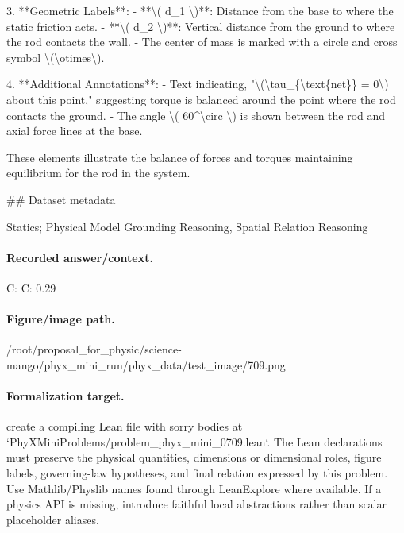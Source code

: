 3. **Geometric Labels**:
   - **\textbackslash{}( d\_1 \textbackslash{})**: Distance from the base to where the static friction acts.
   - **\textbackslash{}( d\_2 \textbackslash{})**: Vertical distance from the ground to where the rod contacts the wall.
   - The center of mass is marked with a circle and cross symbol \textbackslash{}(\textbackslash{}otimes\textbackslash{}).

4. **Additional Annotations**:
   - Text indicating, "\textbackslash{}(\textbackslash{}tau\_\{\textbackslash{}text\{net\}\} = 0\textbackslash{}) about this point," suggesting torque is balanced around the point where the rod contacts the ground.
   - The angle \textbackslash{}( 60\textasciicircum{}\textbackslash{}circ \textbackslash{}) is shown between the rod and axial force lines at the base.

These elements illustrate the balance of forces and torques maintaining equilibrium for the rod in the system.

\#\# Dataset metadata

Statics; Physical Model Grounding Reasoning, Spatial Relation Reasoning

\paragraph{Recorded answer/context.}
C: C: 0.29

\paragraph{Figure/image path.}
/root/proposal\_for\_physic/science-mango/phyx\_mini\_run/phyx\_data/test\_image/709.png

\paragraph{Formalization target.}
create a compiling Lean file with sorry bodies at `PhyXMiniProblems/problem\_phyx\_mini\_0709.lean`. The Lean declarations must preserve the physical quantities, dimensions or dimensional roles, figure labels, governing-law hypotheses, and final relation expressed by this problem.
Use Mathlib/Physlib names found through LeanExplore where available. If a physics API is missing, introduce faithful local abstractions rather than scalar placeholder aliases.


